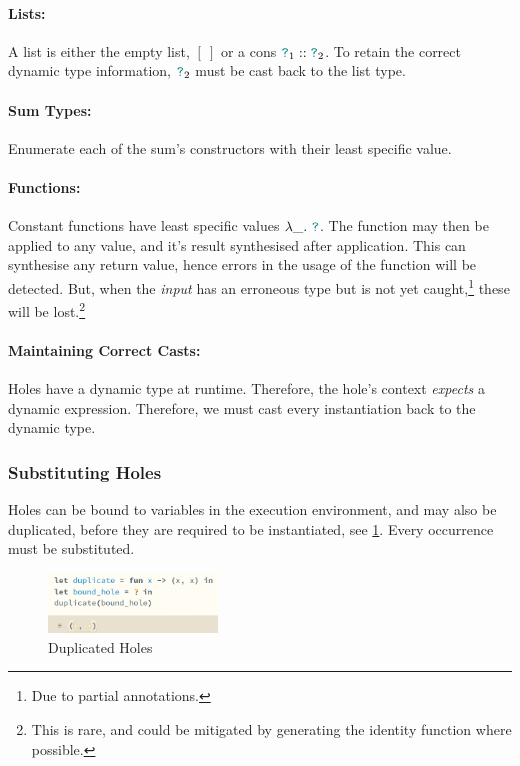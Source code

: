 \paragraph{Lists:} A list is either the empty list, $[\ ]$ or a cons ${\color{teal}\texttt{?}}_1 :: {\color{teal}\texttt{?}}_2$. To retain the correct dynamic type information, ${\color{teal}\texttt{?}}_2$ must be cast back to the list type. 
\paragraph{Sum Types:} Enumerate each of the sum's constructors with their least specific value.
\paragraph{Functions:} Constant functions have least specific values $\lambda \_.\ {\color{teal}\texttt{?}}$. The function may then be applied to any value, and it's result synthesised after application. This can synthesise any return value, hence errors in the usage of the function will be detected. But, when the \textit{input} has an erroneous type but is not yet caught,\footnote{Due to partial annotations.} these will be lost.\footnote{This is rare, and could be mitigated by generating the identity function where possible.}

\paragraph{Maintaining Correct Casts:}
Holes have a dynamic type at runtime. Therefore, the hole's context \textit{expects} a dynamic expression. Therefore, we must cast every instantiation back to the dynamic type.

\subsubsection{Substituting Holes}\label{sec:HoleSubstitutionImplementation}
Holes can be bound to variables in the execution environment, and may also be duplicated, before they are required to be instantiated, see \cref{fig:HoleDuplication}. Every occurrence must be substituted.

\begin{figure}[h]
\centering
\includegraphics[width=0.4\textwidth]{Media/Figures/duplicate_hole}
\caption{Duplicated Holes}
\label{fig:HoleDuplication}
\end{figure}

